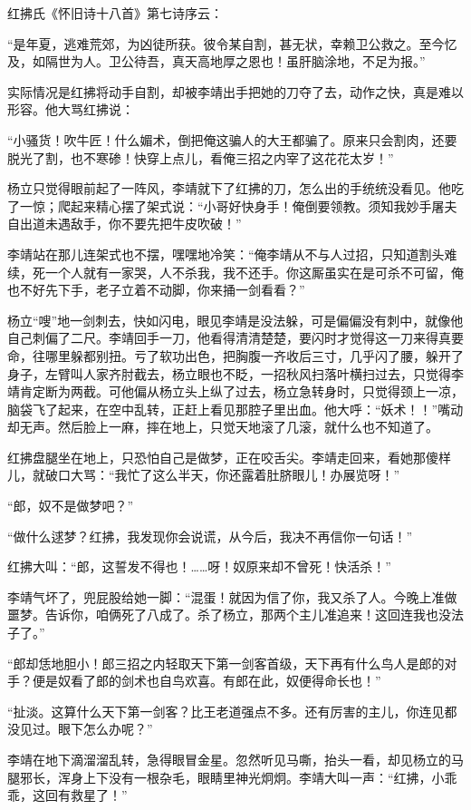 红拂氏《怀旧诗十八首》第七诗序云：

“是年夏，逃难荒郊，为凶徒所获。彼令某自割，甚无状，幸赖卫公救之。至今忆及，如隔世为人。卫公待吾，真天高地厚之恩也！虽肝脑涂地，不足为报。”

实际情况是红拂将动手自割，却被李靖出手把她的刀夺了去，动作之快，真是难以形容。他大骂红拂说：

“小骚货！吹牛匠！什么媚术，倒把俺这骗人的大王都骗了。原来只会割肉，还要脱光了割，也不寒碜！快穿上点儿，看俺三招之内宰了这花花太岁！”

杨立只觉得眼前起了一阵风，李靖就下了红拂的刀，怎么出的手统统没看见。他吃了一惊；爬起来精心摆了架式说：“小哥好快身手！俺倒要领教。须知我妙手屠夫自出道未遇敌手，你不要先把牛皮吹破！”

李靖站在那儿连架式也不摆，嘿嘿地冷笑：“俺李靖从不与人过招，只知道割头难续，死一个人就有一家哭，人不杀我，我不还手。你这厮虽实在是可杀不可留，俺也不好先下手，老子立着不动脚，你来捅一剑看看？”

杨立“嗖”地一剑刺去，快如闪电，眼见李靖是没法躲，可是偏偏没有刺中，就像他自己刺偏了二尺。李靖回手一刀，他看得清清楚楚，要闪时才觉得这一刀来得真要命，往哪里躲都别扭。亏了软功出色，把胸腹一齐收后三寸，几乎闪了腰，躲开了身子，左臂叫人家齐肘截去，杨立眼也不眨，一招秋风扫落叶横扫过去，只觉得李靖肯定断为两截。可他偏从杨立头上纵了过去，杨立急转身时，只觉得颈上一凉，脑袋飞了起来，在空中乱转，正赶上看见那腔子里出血。他大呼：“妖术！！”嘴动却无声。然后脸上一麻，摔在地上，只觉天地滚了几滚，就什么也不知道了。

红拂盘腿坐在地上，只恐怕自己是做梦，正在咬舌尖。李靖走回来，看她那傻样儿，就破口大骂：“我忙了这么半天，你还露着肚脐眼儿！办展览呀！”

“郎，奴不是做梦吧？”

“做什么逑梦？红拂，我发现你会说谎，从今后，我决不再信你一句话！”

红拂大叫：“郎，这誓发不得也！……呀！奴原来却不曾死！快活杀！”

李靖气坏了，兜屁股给她一脚：“混蛋！就因为信了你，我又杀了人。今晚上准做噩梦。告诉你，咱俩死了八成了。杀了杨立，那两个主儿准追来！这回连我也没法子了。”

“郎却恁地胆小！郎三招之内轻取天下第一剑客首级，天下再有什么鸟人是郎的对手？便是奴看了郎的剑术也自鸟欢喜。有郎在此，奴便得命长也！”

“扯淡。这算什么天下第一剑客？比王老道强点不多。还有厉害的主儿，你连见都没见过。眼下怎么办呢？”

李靖在地下滴溜溜乱转，急得眼冒金星。忽然听见马嘶，抬头一看，却见杨立的马腿邪长，浑身上下没有一根杂毛，眼睛里神光炯炯。李靖大叫一声：“红拂，小乖乖，这回有救星了！”

